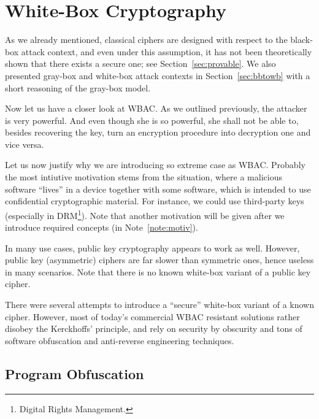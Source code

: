 \section{White-Box Cryptography}
\label{sec:wbc}

As we already mentioned, classical ciphers are designed with respect to the black-box attack context, and even under this assumption, it has not been theoretically shown that there exists a secure one; see Section~\ref{sec:provable}. We also presented gray-box and white-box attack contexts in Section~\ref{sec:bbtowb} with a short reasoning of the gray-box model.

Now let us have a closer look at WBAC. As we outlined previously, the attacker is very powerful. And even though she is so powerful, she shall not be able to, besides recovering the key, turn an encryption procedure into decryption one and vice versa.

Let us now justify why we are introducing so extreme case as WBAC. Probably the most intiutive motivation stems from the situation, where a malicious software ``lives'' in a device together with some software, which is intended to use confidential cryptographic material. For instance, we could use third-party keys (especially in DRM\footnote{Digital Rights Management.}). Note that another motivation will be given after we introduce required concepts (in Note~\ref{note:motiv}).

In many use cases, public key cryptography appears to work as well. However, public key (asymmetric) ciphers are far slower than symmetric ones, hence useless in many scenarios. Note that there is no known white-box variant of a public key cipher.

There were several attempts to introduce a ``secure'' white-box variant of a known cipher. However, most of today's commercial WBAC resistant solutions rather disobey the Kerckhoffs' principle, and rely on security by obscurity and tons of software obfuscation and anti-reverse engineering techniques.




\subsection{Program Obfuscation}
\label{sec:impos}

